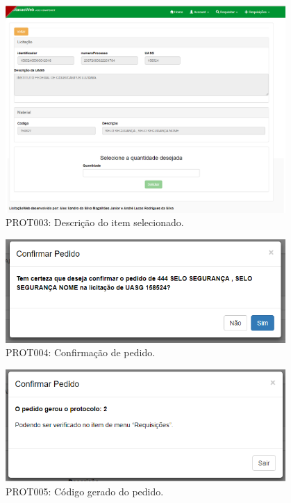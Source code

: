 \begin{anexosenv}
\begin{figure}[htbp]
    \centering
    \includegraphics[width=0.95\textwidth]{figuras/prototipo003.png}
    \caption[PROT003]{PROT003: Descrição do item selecionado.}
    \label{PROT003}
\end{figure}

\begin{figure}[htbp]
    \centering
    \includegraphics[width=0.95\textwidth]{figuras/prototipo004.png}
    \caption[PROT004]{PROT004: Confirmação de pedido.}
    \label{PROT004}
\end{figure}

\begin{figure}[htbp]
    \centering
    \includegraphics[width=0.95\textwidth]{figuras/prototipo005.png}
    \caption[PROT005]{PROT005: Código gerado do pedido.}
    \label{PROT005}
\end{figure}


\end{anexosenv}
